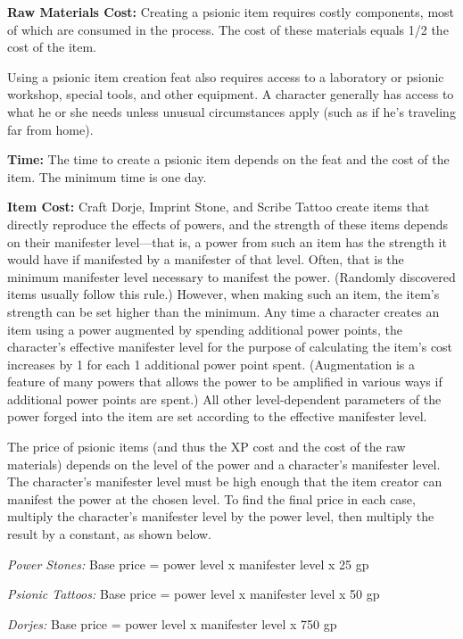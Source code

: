 \documentclass{article}
\begin{document}
\textbf{Raw Materials Cost:} Creating a psionic item requires costly components, 
most of which are consumed in the process. The cost of these materials equals 1/2 
the cost of the item.

Using a psionic item creation feat also requires access to a laboratory or psionic 
workshop, special tools, and other equipment. A character generally has access 
to what he or she needs unless unusual circumstances apply (such as if he's traveling 
far from home).

\textbf{Time:} The time to create a psionic item depends on the feat and the cost 
of the item. The minimum time is one day.

\textbf{Item Cost:} Craft Dorje, Imprint Stone, and Scribe Tattoo create items 
that directly reproduce the effects of powers, and the strength of these items 
depends on their manifester level---that is, a power from such an item has the 
strength it would have if manifested by a manifester of that level. Often, that 
is the minimum manifester level necessary to manifest the power. (Randomly discovered 
items usually follow this rule.) However, when making such an item, the item's 
strength can be set higher than the minimum. Any time a character creates an item 
using a power augmented by spending additional power points, the character's effective 
manifester level for the purpose of calculating the item's cost increases by 1 
for each 1 additional power point spent. (Augmentation is a feature of many powers 
that allows the power to be amplified in various ways if additional power points 
are spent.) All other level-dependent parameters of the power forged into the item 
are set according to the effective manifester level.

The price of psionic items (and thus the XP cost and the cost of the raw materials) 
depends on the level of the power and a character's manifester level. The character's 
manifester level must be high enough that the item creator can manifest the power 
at the chosen level. To find the final price in each case, multiply the character's 
manifester level by the power level, then multiply the result by a constant, as 
shown below.

\textit{Power Stones: }Base price = power level x manifester level x 25 gp

\textit{Psionic Tattoos: }Base price = power level x manifester level x 50 gp

\textit{Dorjes: }Base price = power level x manifester level x 750 gp
\end{document}
